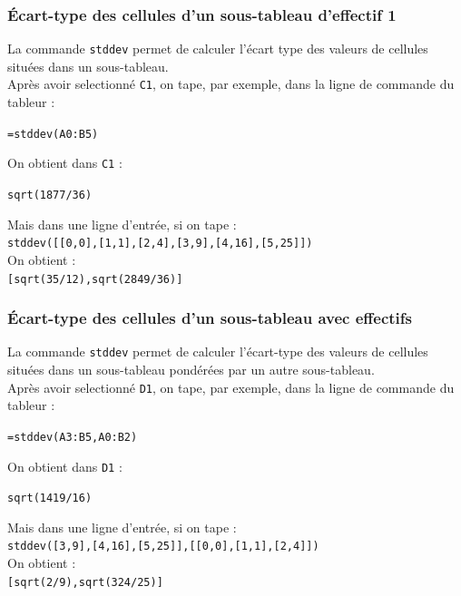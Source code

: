 \documentclass[a4paper,11pt]{book}
\begin{document}
\subsubsection{\'Ecart-type des cellules d'un sous-tableau d'effectif 1}
La commande {\tt stddev} permet de calculer l'\'ecart type des valeurs de
 cellules situ\'ees dans un sous-tableau.\\
 Apr\`es avoir selectionn\'e {\tt C1}, on tape, par exemple, dans la ligne de 
commande du tableur :
\begin{center}{\tt =stddev(A0:B5)}\end{center}
On obtient dans {\tt C1} :
\begin{center}{\tt  sqrt(1877/36)}\end{center}
Mais dans une ligne d'entr\'ee, si on tape :\\
{\tt stddev([[0,0],[1,1],[2,4],[3,9],[4,16],[5,25]])}\\
On obtient :\\
{\tt [sqrt(35/12),sqrt(2849/36)]}
\subsubsection{\'Ecart-type des cellules d'un sous-tableau avec effectifs}
La commande {\tt stddev} permet de calculer l'\'ecart-type des valeurs de
cellules situ\'ees dans un sous-tableau pond\'er\'ees par un autre sous-tableau.\\ 
Apr\`es avoir selectionn\'e {\tt D1}, on tape, par exemple, dans la ligne de 
commande du tableur :
\begin{center}{\tt =stddev(A3:B5,A0:B2)}\end{center}
On obtient dans {\tt D1} :
\begin{center}{\tt sqrt(1419/16)}\end{center}
Mais dans une ligne d'entr\'ee, si on tape :\\
{\tt stddev([3,9],[4,16],[5,25]],[[0,0],[1,1],[2,4]])}\\
On obtient :\\
{\tt [sqrt(2/9),sqrt(324/25)]}
\end{document}
